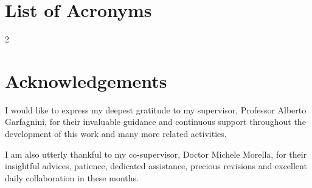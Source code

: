 \documentclass[a4paper,11pt]{book}
\newcommand{\chapterNumberSize}{\fontsize{55pt}{65pt}\selectfont}
\newcommand{\chapterTitleSize}{\fontsize{36pt}{44pt}\selectfont}
\begin{document}


\clearpage

\tableofcontents
\cleardoublepage

\mainmatter







\appendix
\renewcommand{\chapterNumberSize}{\fontsize{55pt}{65pt}\selectfont}
\renewcommand{\chapterTitleSize}{\fontsize{30pt}{38pt}\selectfont}


% 
% 
% 




\renewcommand{\chapterTitleSize}{\fontsize{36pt}{44pt}\selectfont}

\chapter*{List of Acronyms}

\begin{multicols}{2}
  \printacronyms[heading=none] 
\end{multicols}

\cleardoublepage
{}
{}
\printbibliography

\chapter*{Acknowledgements}
I would like to express my deepest gratitude to my supervisor, Professor Alberto Garfagnini, for their invaluable guidance and continuous support throughout the development of this work and many more related activities.

I am also utterly thankful to my co-supervisor, Doctor Michele Morella, for their insightful advices, patience, dedicated assistance, precious revisions and excellent daily collaboration in these months. 
\end{document}

